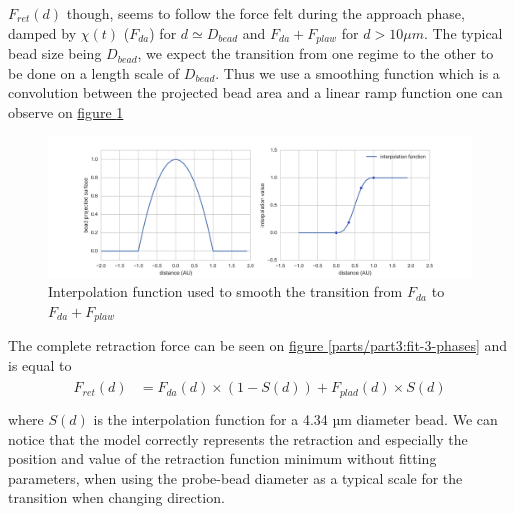 \documentclass[A4paperpaper,11pt,english]{sphinxmanual}
\begin{document}
\(F_{ret}(d)\) though, seems to follow the force felt during the approach phase,
damped by \(\chi(t)\) (\(F_{da}\)) for \(d\simeq{D_{bead}}\) and
\(F_{da}+F_{plaw}\) for \(d > 10\mu{}m\).  The
typical bead size being \(D_{bead}\), we expect the transition from
one regime to the other to be done on a length scale of \(D_{bead}\). Thus
we use a smoothing function which is a convolution between the projected bead
area and a linear ramp function one can observe on \hyperref[parts/part3:interp]{figure  \ref*{parts/part3:interp}}
\begin{figure}[htbp]
\centering
\capstart

\includegraphics[width=0.900\linewidth]{interpolation.png}
\caption{Interpolation function used to smooth the transition from \(F_{da}\) to
\(F_{da}+F_{plaw}\)}\label{parts/part3:interp}\end{figure}

The complete retraction force can be seen on \hyperref[parts/part3:fit-3-phases]{figure  \ref*{parts/part3:fit-3-phases}} and is equal to
\label{parts/part3:equation-eqa314}\begin{gather}
\begin{split}F_{ret}(d) &= F_{da}(d)\times(1-S(d)) + F_{plad}(d)\times S(d)\\\end{split}\label{parts/part3-eqa314}
\end{gather}
where \(S(d)\) is the interpolation function for a 4.34 µm
diameter bead. We can notice that the model correctly represents the retraction and especially
the position and value of the retraction function minimum without
fitting parameters, when using the probe-bead diameter as a typical scale
for the transition when changing direction.
\end{document}
